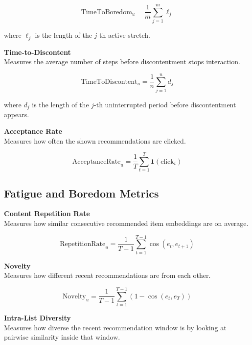 \begin{equation}
    \mathrm{TimeToBoredom}_u=\frac{1}{m}\sum_{j=1}^{m} \ell_j
\end{equation}

where $\ell_j$ is the length of the $j$-th active stretch. 


\noindent \textbf{Time-to-Discontent} \\
Measures the average number of steps before discontentment stops interaction.

\begin{equation}
    \mathrm{TimeToDiscontent}_u=\frac{1}{n}\sum_{j=1}^{n} d_j
\end{equation}

where $d_j$ is the length of the $j$-th uninterrupted period before discontentment appears. 


\noindent \textbf{Acceptance Rate} \\
Measures how often the shown recommendations are clicked.

\begin{equation}
    \mathrm{AcceptanceRate}_u=\frac{1}{T}\sum_{t=1}^{T}\mathbf{1}(\text{click}_t)
\end{equation}



\subsection{Fatigue and Boredom Metrics}


\noindent \textbf{Content Repetition Rate} \\
Measures how similar consecutive recommended item embeddings are on average.

\begin{equation}
    \mathrm{RepetitionRate}_u=\frac{1}{T-1}\sum_{t=1}^{T-1}\cos(e_t,e_{t+1})
\end{equation}


\noindent \textbf{Novelty} \\
Measures how different recent recommendations are from each other.

\begin{equation}
    \mathrm{Novelty}_u=\frac{1}{T-1}\sum_{t=1}^{T-1}\left(1-\cos(e_t,e_T)\right)
\end{equation}


\noindent \textbf{Intra-List Diversity} \\
Measures how diverse the recent recommendation window is by looking at pairwise similarity inside that window.

